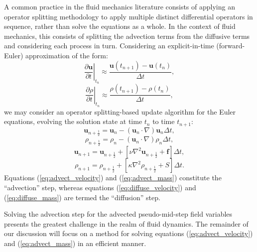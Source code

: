 \documentclass[12pt]{article}
\begin{document}
A common practice in the fluid mechanics literature consists of applying an operator splitting methodology to apply multiple distinct differential operators in sequence, rather than solve the equations as a whole. In the context of fluid mechanics, this consists of splitting the advection terms from the diffusive terms and considering each process in turn. Considering an explicit-in-time (forward-Euler) approximation of the form:
\begin{equation}
  \left. \frac{\partial \mathbf{u}}{\partial t} \right|_{t_n} \approx \frac{\mathbf{u} (t_{n+1}) - \mathbf{u} (t_n)}{\Delta t},
\end{equation}
\begin{equation}
  \left. \frac{\partial \rho}{\partial t} \right|_{t_n} \approx \frac{\rho (t_{n+1}) - \rho (t_n)}{\Delta t},
\end{equation}
we may consider an operator splitting-based update algorithm for the Euler equations, evolving the solution state at time $t_n$ to time $t_{n+1}$:
\begin{equation}
  \mathbf{u}_{n+\frac{1}{2}} = \mathbf{u}_n - (\mathbf{u}_n \cdot \nabla) \mathbf{u}_n \Delta t,
  \label{eq:advect_velocity}
\end{equation}
\begin{equation}
  \rho_{n+\frac{1}{2}} = \rho_n - (\mathbf{u}_n \cdot \nabla) \rho_n \Delta t,
  \label{eq:advect_mass}
\end{equation}
\begin{equation}
  \mathbf{u}_{n+1} = \mathbf{u}_{n+\frac{1}{2}} + \left[ \nu \nabla^2 \mathbf{u}_{n+\frac{1}{2}} + \mathbf{f} \right] \Delta t,
  \label{eq:diffuse_velocity}
\end{equation}
\begin{equation}
  \rho_{n+1} = \rho_{n+\frac{1}{2}} + \left[ \kappa \nabla^2 \rho_{n+\frac{1}{2}} + S \right] \Delta t.
  \label{eq:diffuse_mass}
\end{equation}
Equations (\ref{eq:advect_velocity}) and (\ref{eq:advect_mass}) constitute the ``advection'' step, whereas equations (\ref{eq:diffuse_velocity}) and (\ref{eq:diffuse_mass}) are termed the ``diffusion'' step.

Solving the advection step for the advected pseudo-mid-step field variables presents the greatest challenge in the realm of fluid dynamics. The remainder of our discussion will focus on a method for solving equations (\ref{eq:advect_velocity}) and (\ref{eq:advect_mass}) in an efficient manner.
\end{document}

